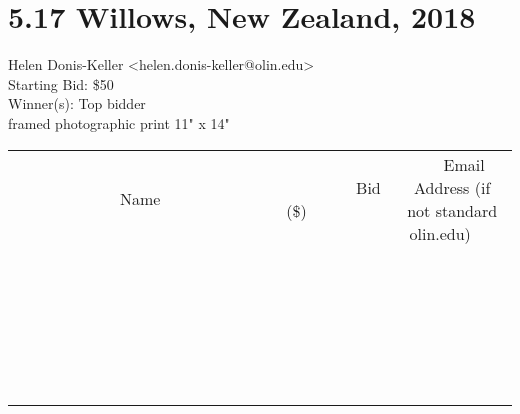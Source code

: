 \documentclass[11pt]{article}
\begin{document}
					\section*{5.17 Willows, New Zealand, 2018}
					Helen Donis-Keller <helen.donis-keller@olin.edu> \\
					Starting Bid: \$50 \\
					Winner(s): Top bidder \\
					framed photographic print 11" x 14" \\
					[6ex]
					\begin{tabular}{c c c}
						~~~~~~~~~~~~~Name~~~~~~~~~~~~~ & ~~~~~~~~~Bid (\$)~~~~~~~~~ & ~~~Email Address (if not standard olin.edu)~~~ \\
				
 & & \\
\hline
 & & \\
\hline
 & & \\
\hline
 & & \\
\hline
 & & \\
\hline
 & & \\
\hline
 & & \\
\hline
 & & \\
\hline
 & & \\
\hline
 & & \\
\hline
 & & \\
\hline
 & & \\
\hline
 & & \\
\hline
 & & \\
\hline
 & & \\
\hline
 & & \\
\hline
 & & \\
\hline
 & & \\
\hline
 & & \\
\hline
 & & \\
\hline
 & & \\
\hline
 & & \\
\hline
 & & \\
\hline
 & & \\
\hline
 & & \\
\hline
 & & \\
\hline
					\end{tabular}
					\clearpage
				
\end{document}
